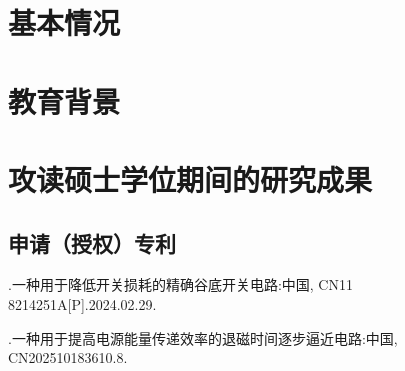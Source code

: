\section{基本情况}  
\section{教育背景}

\section{攻读硕士学位期间的研究成果}

\subsection{申请（授权）专利}
\begin{resresult}
	\item {}.一种用于降低开关损耗的精确谷底开关电路:中国, CN11\\8214251A[P].2024.02.29.
	\item {}.一种用于提高电源能量传递效率的退磁时间逐步逼近电路:中国, CN202510183610.8.
\end{resresult}

